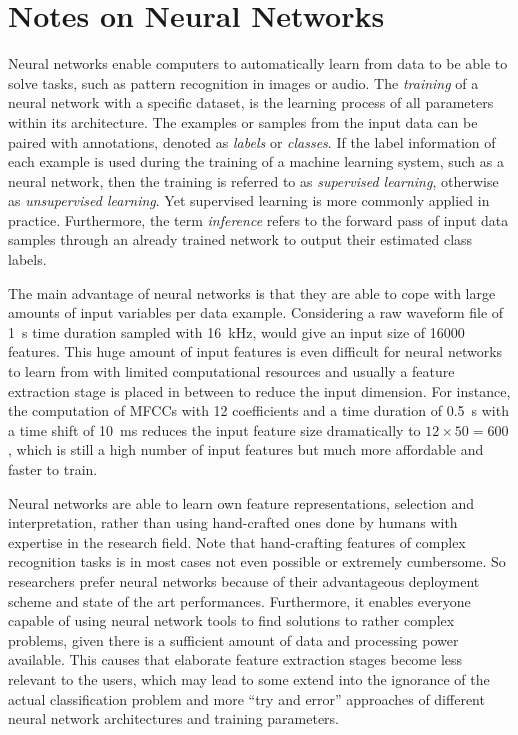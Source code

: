 
\section{Notes on Neural Networks}\label{sec:intro_nn}
Neural networks enable computers to automatically learn from data to be able to solve tasks, such as pattern recognition in images or audio.
The \emph{training} of a neural network with a specific dataset, is the learning process of all parameters within its architecture.
The examples or samples from the input data can be paired with annotations, denoted as \emph{labels} or \emph{classes}.
If the label information of each example is used during the training of a machine learning system, such as a neural network, then the training is referred to as \emph{supervised learning}, otherwise as \emph{unsupervised learning}.
Yet supervised learning is more commonly applied in practice.
Furthermore, the term \emph{inference} refers to the forward pass of input data samples through an already trained network to output their estimated class labels.

The main advantage of neural networks is that they are able to cope with large amounts of input variables per data example.
Considering a raw waveform file of \SI{1}{s} time duration sampled with \SI{16}{\kilo\hertz}, would give an input size of 16000 features.
This huge amount of input features is even difficult for neural networks to learn from with limited computational resources and usually a feature extraction stage is placed in between to reduce the input dimension.
For instance, the computation of MFCCs with 12 coefficients and a time duration of \SI{0.5}{s} with a time shift of \SI{10}{\milli\second} reduces the input feature size dramatically to $12 \times 50 = 600$, which is still a high number of input features but much more affordable and faster to train.

Neural networks are able to learn own feature representations, selection and interpretation, rather than using hand-crafted ones done by humans with expertise in the research field.
Note that hand-crafting features of complex recognition tasks is in most cases not even possible or extremely cumbersome.
So researchers prefer neural networks because of their advantageous deployment scheme and state of the art performances.
Furthermore, it enables everyone capable of using neural network tools to find solutions to rather complex problems, given there is a sufficient amount of data and processing power available.
This causes that elaborate feature extraction stages become less relevant to the users, which may lead to some extend into the ignorance of the actual classification problem and more \enquote{try and error} approaches of different neural network architectures and training parameters.

